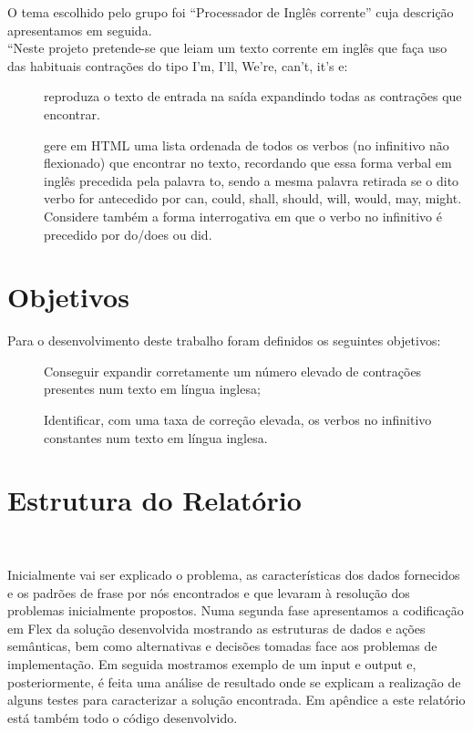 \documentclass{report}
\begin{document}
O tema escolhido pelo grupo foi “Processador de Inglês corrente” cuja descrição apresentamos em seguida.
\\
“Neste projeto pretende-se que leiam um texto corrente em inglês que faça uso das habituais contrações do tipo I'm, I'll, We're, can't, it's e:
\begin{description}
\item[] reproduza o texto de entrada na saída expandindo todas as contrações que encontrar.
\item[] gere em HTML uma lista ordenada de todos os verbos (no infinitivo não flexionado) que encontrar no texto, recordando que essa forma verbal em inglês precedida pela palavra to, sendo a mesma palavra retirada se o dito verbo for antecedido por can, could, shall, should, will, would, may, might. Considere também a forma interrogativa em que o verbo no infinitivo é precedido por do/does ou did.
\end{description}

\section*{Objetivos}
Para o desenvolvimento deste trabalho foram definidos os seguintes objetivos:
\\
\begin{description}
\item[] Conseguir expandir corretamente um número elevado de contrações presentes num texto em língua inglesa;
\item[] Identificar, com uma taxa de correção elevada, os verbos no infinitivo constantes num texto em língua inglesa.
\end{description}

\section*{Estrutura do Relatório} \

Inicialmente vai ser explicado o problema, as características dos dados fornecidos e os padrões de frase por nós encontrados e que levaram à resolução dos problemas inicialmente propostos.
Numa segunda fase apresentamos a codificação em Flex da solução desenvolvida mostrando as estruturas de dados e ações semânticas, bem como alternativas e decisões tomadas face aos problemas de implementação.
Em seguida mostramos exemplo de um input e output e, posteriormente, é feita uma análise de resultado onde se explicam a realização de alguns testes para caracterizar a solução encontrada.
Em apêndice a este relatório está também todo o código desenvolvido.
\end{document}

